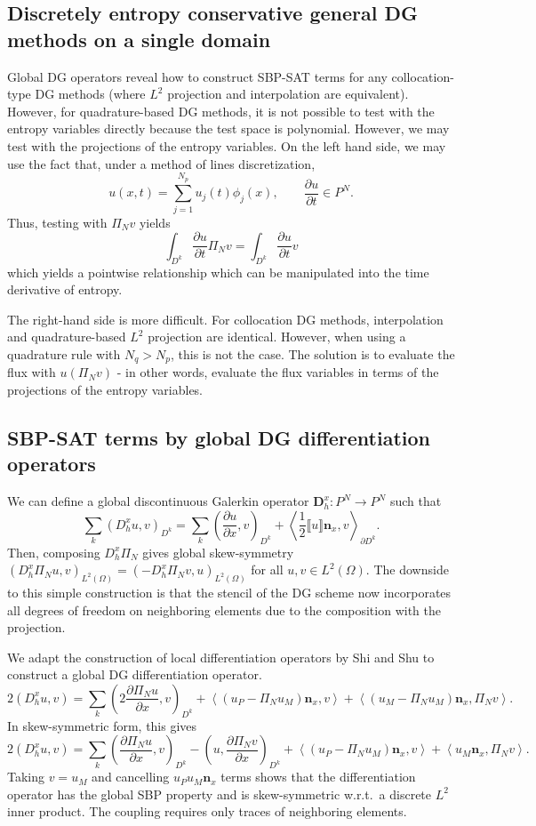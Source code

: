 \documentclass[preprint,10pt]{article}
\theoremstyle{definition}
\theoremstyle{lemma}
\theoremstyle{theorem}
\newcommand{\pd}[2]{\frac{\partial#1}{\partial#2}}
\newcommand{\LRp}[1]{\left( #1 \right)}
\newcommand{\LRa}[1]{\left\langle #1 \right\rangle}
\newcommand{\jump}[1] {\ensuremath{\llbracket#1\rrbracket}}
\renewcommand{\L}{L^2\LRp{\Omega}}
\begin{document}
\subsection{Discretely entropy conservative general DG methods on a single domain}

Global DG operators reveal how to construct SBP-SAT terms for any collocation-type DG methods (where $L^2$ projection and interpolation are equivalent).  However, for quadrature-based DG methods, it is not possible to test with the entropy variables directly because the test space is polynomial.  However, we may test with the projections of the entropy variables.  On the left hand side, we may use the fact that, under a method of lines discretization, 
\[
u(x,t) = \sum_{j=1}^{N_p} u_j(t) \phi_j(x), \qquad \pd{u}{t} \in P^N.
\]
Thus, testing with $\Pi_N v$ yields
\[
\int_{D^k} \pd{u}{t}\Pi_N v = \int_{D^k} \pd{u}{t} v   
\]
which yields a pointwise relationship which can be manipulated into the time derivative of entropy.  

The right-hand side is more difficult.  For collocation DG methods, interpolation and quadrature-based $L^2$ projection are identical.  However, when using a quadrature rule with $N_q > N_p$, this is not the case.  The solution is to evaluate the flux with $u(\Pi_N v)$ - in other words, evaluate the flux variables in terms of the projections of the entropy variables.  

\subsection{SBP-SAT terms by global DG differentiation operators}

We can define a global discontinuous Galerkin operator $\bm{D}^x_h: P^N\rightarrow P^N$ such that
\[
\sum_k \LRp{D^x_h u,v}_{D^k} = \sum_k \LRp{\pd{u}{x},v}_{D^k} + \LRa{\frac{1}{2}\jump{u}\bm{n}_x,v}_{\partial D^k}.
\]
Then, composing $D^x_h \Pi_N$ gives global skew-symmetry $\LRp{D^x_h\Pi_N u, v}_{\L} = \LRp{- D^x_h\Pi_N v, u}_{\L}$ for all $u,v\in \L$.  The downside to this simple construction is that the stencil of the DG scheme now incorporates all degrees of freedom on neighboring elements due to the composition with the projection.  

We adapt the construction of local differentiation operators by Shi and Shu to construct a global DG differentiation operator.  
\[
2\LRp{D^x_h u,v} = \sum_k \LRp{2\pd{ \Pi_N u}{x},v}_{D^k} + \LRa{\LRp{u_P - \Pi_N u_M}\bm{n}_x, v} + \LRa{\LRp{u_M - \Pi_Nu_M }\bm{n}_x,\Pi_Nv}.
\]
In skew-symmetric form, this gives 
\[
2\LRp{D^x_h u,v} = \sum_k \LRp{\pd{ \Pi_N u}{x},v}_{D^k} - \LRp{u,\pd{\Pi_N v}{x}}_{D^k} + \LRa{\LRp{u_P - \Pi_N u_M}\bm{n}_x, v} + \LRa{{u_M }\bm{n}_x,\Pi_Nv}.
\]
Taking $v = u_M$ and cancelling $u_P u_M \bm{n}_x$ terms shows that the differentiation operator has the global SBP property and is skew-symmetric  w.r.t.\ a discrete $L^2$ inner product.  The coupling requires only traces of neighboring elements.  
\end{document}
